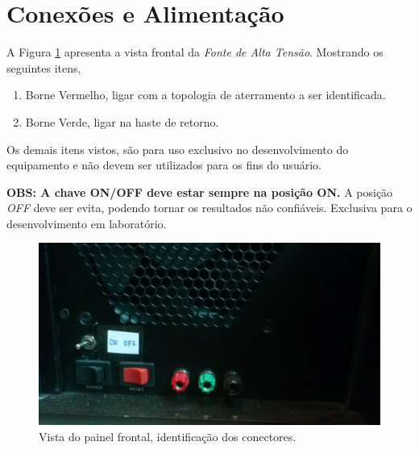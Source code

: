 \documentclass[a4paper, 10pt]{article}
\begin{document}
\section{Conexões e Alimentação}

A Figura \ref{fig_painel_frontal} apresenta a vista frontal da \textit{Fonte de Alta Tensão}.
Mostrando os seguintes itens, 

\begin{enumerate}
    \item Borne Vermelho, ligar com a topologia de aterramento a ser identificada.
    \item Borne Verde, ligar na haste de retorno.



\end{enumerate}

Os demais itens vistos, são para uso exclusivo no desenvolvimento do equipamento e não devem
ser utilizados para os fins do usuário. 

\textbf{OBS: A chave ON/OFF deve estar sempre na posição ON.} A posição \textit{OFF} deve ser 
evita, podendo tornar os resultados não confiáveis. Exclusiva para o desenvolvimento
em laboratório.

\begin{figure}[!h]
        \caption{\label{fig_painel_frontal} Vista do painel frontal, identificação dos conectores.}
	    \begin{center}
            \includegraphics[scale=0.1]{../fotos/painel_frontal.jpg}
	    \end{center}
\end{figure}

\end{document}
